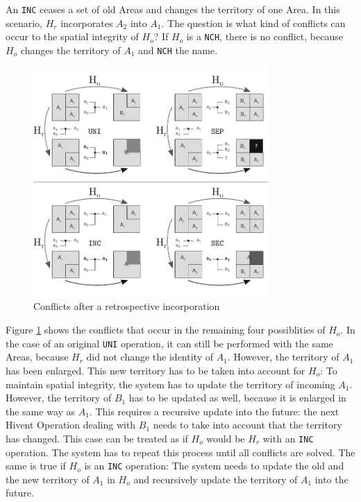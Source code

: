 An \texttt{INC} ceases a set of old Areas and changes the territory of one Area. In this scenario, $H_r$ incorporates $A_2$ into $A_1$. The question is what kind of conflicts can occur to the spatial integrity of $H_o$? If $H_o$ is  a \texttt{NCH}, there is no conflict, because $H_o$ changes the territory of $A_1$ and \texttt{NCH} the name.

\begin{figure}[ht]
\vspace{1em}
  \centering
  \includegraphics[width=0.8\textwidth]{graphics/development/editing_hivent_data/retrospective_updates/INC}
  \caption{Conflicts after a retrospective incorporation}
  \label{fig:update_conflict_INC}
\end{figure}

Figure \ref{fig:update_conflict_INC} shows the conflicts that occur in the remaining four possiblities of $H_o$. In the case of an original \texttt{UNI} operation, it can still be performed with the same Areas, because $H_r$ did not change the identity of $A_1$. However, the territory of $A_1$ has been enlarged. This new territory has to be taken into account for $H_o$: To maintain spatial integrity, the system has to update the territory of incoming $A_1$. However, the territory of $B_1$ has to be updated as well, because it is enlarged in the same way as $A_1$. This requires a recursive update into the future: the next Hivent Operation dealing with $B_1$ needs to take into account that the territory has changed. This case can be treated as if $H_o$ would be $H_r$ with an \texttt{INC} operation. The system has to repeat this process until all conflicts are solved. The same is true if $H_o$ is an \texttt{INC} operation: The system needs to update the old and the new territory of $A_1$ in $H_o$ and recursively update the territory of $A_1$ into the future.

